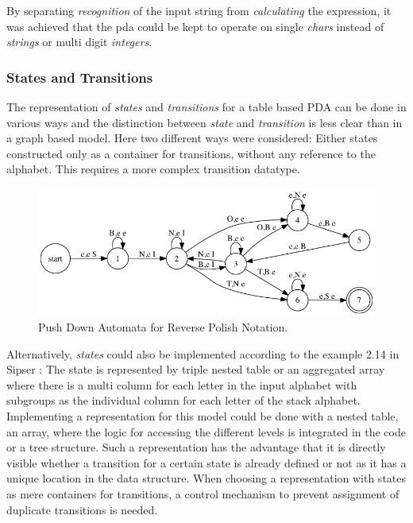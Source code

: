 \documentclass[a4paper,11pt,twoside]{article}
\begin{document}
By separating \textit{recognition} of the input string from
\textit{calculating} the expression, it was achieved that the pda
could be kept to operate on single \textit{chars} instead of
\textit{strings} or multi digit \textit{integers}.  

\subsubsection{States and Transitions}
The representation of \textit{states} and \textit{transitions} for
a table based PDA can be done in various ways and the distinction
between \textit{state} and \textit{transition} is less clear than in a
graph based model. Here two different ways were considered: Either
states constructed only as a container for transitions, without any 
reference to the alphabet. This requires a more complex
transition datatype. 

\begin{figure}
 \centering
  \includegraphics[width=\textwidth]{pda}
  \caption{Push Down Automata for Reverse Polish Notation.}
\end{figure}


Alternatively, \textit{states} could also be implemented according to
the example 2.14 in Sipser \cite[p. 114]{sipser2012}: The state is
represented by triple nested table or
an aggregated array where there is a multi column for each letter in
the input alphabet with subgroups as the individual column for each
letter of the stack alphabet. Implementing a representation for this
model could be done with a nested table, an array, where the logic for
accessing the different levels is integrated in the code or a tree
structure. Such a representation has the advantage that it is directly
visible whether a transition for a certain state is already defined or
not as it has a unique location in the data structure. When choosing a
representation with states as mere containers for transitions, a
control mechanism to prevent assignment of duplicate transitions is
needed. 
\end{document}
